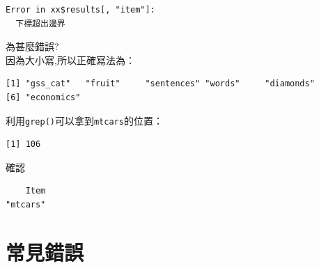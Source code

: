 \documentclass[]{book}
\newenvironment{Shaded}{\begin{snugshade}}{\end{snugshade}}
\newcommand{\KeywordTok}[1]{\textcolor[rgb]{0.13,0.29,0.53}{\textbf{#1}}}
\newcommand{\NormalTok}[1]{#1}
\newcommand{\OperatorTok}[1]{\textcolor[rgb]{0.81,0.36,0.00}{\textbf{#1}}}
\newcommand{\StringTok}[1]{\textcolor[rgb]{0.31,0.60,0.02}{#1}}
\theoremstyle{definition}
\theoremstyle{definition}
\theoremstyle{definition}
\theoremstyle{remark}
\begin{document}
\begin{Shaded}
\end{Shaded}

\begin{verbatim}
Error in xx$results[, "item"]:
  下標超出邊界
\end{verbatim}

為甚麼錯誤?\\
因為大小寫,所以正確寫法為：

\begin{Shaded}
\end{Shaded}

\begin{verbatim}
[1] "gss_cat"   "fruit"     "sentences" "words"     "diamonds" 
[6] "economics"
\end{verbatim}

利用\texttt{grep()}可以拿到\texttt{mtcars}的位置：

\begin{Shaded}
\end{Shaded}

\begin{verbatim}
[1] 106
\end{verbatim}

確認

\begin{Shaded}
\end{Shaded}

\begin{verbatim}
    Item 
"mtcars" 
\end{verbatim}

\section{常見錯誤}
\end{document}
